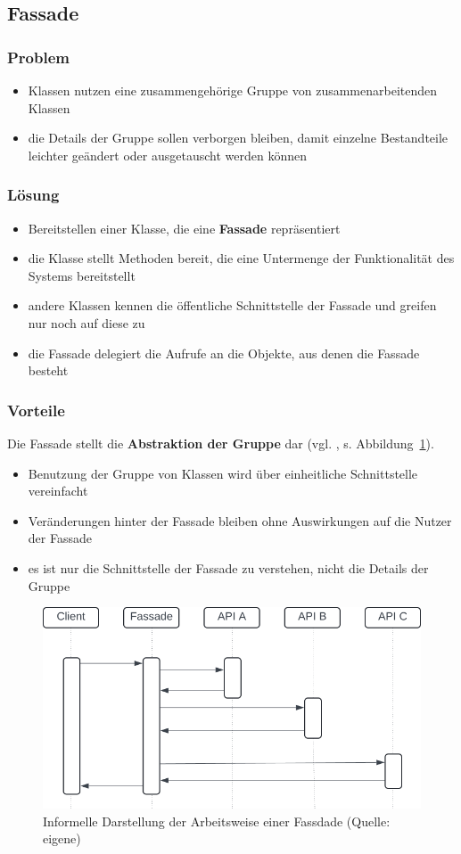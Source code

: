 \subsection{Fassade}

\subsubsection*{Problem}
\begin{itemize}
    \item Klassen nutzen eine zusammengehörige Gruppe von zusammenarbeitenden Klassen
    \item die Details der Gruppe sollen verborgen bleiben, damit einzelne Bestandteile leichter geändert oder ausgetauscht werden können
\end{itemize}

\subsubsection*{Lösung}
\begin{itemize}
    \item Bereitstellen einer Klasse, die eine \textbf{Fassade} repräsentiert
    \item die Klasse stellt Methoden bereit, die eine Untermenge der Funktionalität des Systems bereitstellt
    \item andere Klassen kennen die öffentliche Schnittstelle der Fassade und greifen nur noch auf diese zu
    \item die Fassade delegiert die Aufrufe an die Objekte, aus denen die Fassade besteht
\end{itemize}

\subsubsection*{Vorteile}
Die Fassade stellt die \textbf{Abstraktion der Gruppe} dar (vgl. \cite[61]{Wed09b}, s. Abbildung~\ref{fig:fassade}).

\begin{itemize}
    \item Benutzung der Gruppe von Klassen wird über einheitliche Schnittstelle vereinfacht
    \item Veränderungen hinter der Fassade bleiben ohne Auswirkungen auf die Nutzer der Fassade
    \item es ist nur die Schnittstelle der Fassade zu verstehen, nicht die Details der Gruppe
\end{itemize}

\begin{figure}
    \centering
    \includegraphics[scale=0.4]{part two/Objektorientierter Entwurf/img/fassade}
    \caption{Informelle Darstellung der Arbeitsweise einer Fassdade (Quelle: eigene)}
    \label{fig:fassade}
\end{figure}
